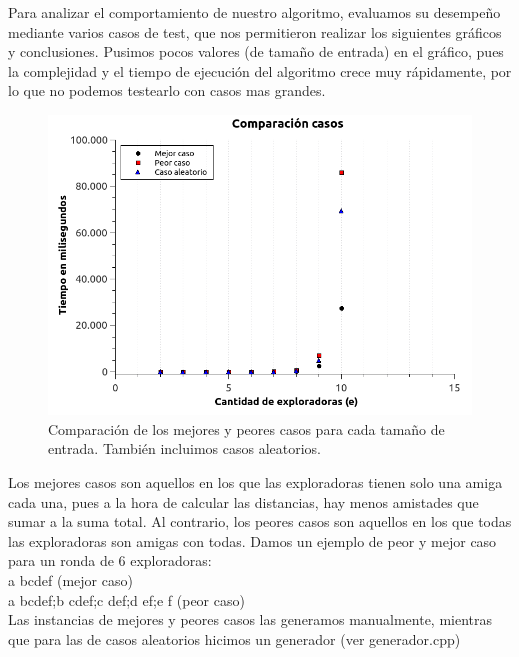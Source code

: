 \begin{itemize}
Para analizar el comportamiento de nuestro algoritmo, evaluamos su desempeño mediante varios casos de test, que nos permitieron realizar los siguientes gráficos y conclusiones. Pusimos pocos valores (de tamaño de entrada) en el gráfico, pues la complejidad y el tiempo de ejecución del algoritmo crece muy rápidamente, por lo que no podemos testearlo con casos mas grandes. 

\begin{figure}[H] 
\begin{center}

  \includegraphics[width=\linewidth]{../graficos/ej3/ComparacionCasos.png}
  \caption{{\small Comparación de los mejores y peores casos para cada tamaño de entrada. También incluimos casos aleatorios.}} \label{asd}
\endminipage

\end{center}
\end{figure} 

Los mejores casos son aquellos en los que las exploradoras tienen solo una amiga cada una, pues a la hora de calcular las distancias, hay menos amistades que sumar a la suma total. Al contrario, los peores casos son aquellos en los que todas las exploradoras son amigas con todas. Damos un ejemplo de peor y mejor caso para un ronda de 6 exploradoras: \\
a bcdef (mejor caso) \\
a bcdef;b cdef;c def;d ef;e f (peor caso) \\
Las instancias de mejores y peores casos las generamos manualmente, mientras que para las de casos aleatorios hicimos un generador (ver generador.cpp)



\end{itemize}
